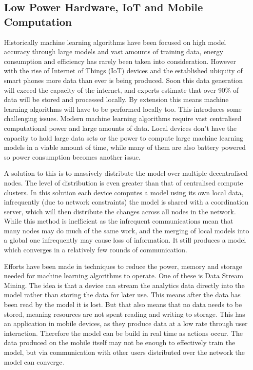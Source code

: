 \subsection{Low Power Hardware, IoT and Mobile Computation}

Historically machine learning algorithms have been focused on high model
accuracy through large models and vast amounts of training data, energy
consumption and efficiency has rarely been taken into consideration. However
with the rise of Internet of Things (IoT) devices and the established ubiquity
of smart phones more data than ever is being produced. Soon this data generation
will exceed the capacity of the internet, and experts estimate that over 90\% of
data will be stored and processed locally. \cite{Chaing2016FogIoT} By extension
this means machine learning algorithms will have to be performed locally too.
This introduces some challenging issues. Modern machine learning algorithms
require vast centralised computational power and large amounts of data. Local
devices don't have the capacity to hold large data sets or the power to compute
large machine learning models in a viable amount of time, while many of them are
also battery powered so power consumption becomes another issue.

A solution to this is to massively distribute the model over multiple
decentralised nodes. The level of distribution is even greater than that of
centralised compute clusters. In this solution each device computes a model
using its own local data, infrequently (due to network constraints) the model is
shared with a coordination server, which will then distribute the changes across
all nodes in the network. \cite{wang2018EdgeLearning} While this method is
inefficient as the infrequent communications mean that many nodes may do much of
the same work, and the merging of local models into a global one infrequently
may cause loss of information. It still produces a model which converges in a
relatively few rounds of communication. \cite{konevcny2016federated}

Efforts have been made in techniques to reduce the power, memory and storage
needed for machine learning algorithms to operate. One of these is Data Stream
Mining. The idea is that a device can stream the analytics data directly into
the model rather than storing the data for later use.
\cite{garciaMartin2019MLEnergy} This means after the data has been read by the
model it is lost. But that also means that no data needs to be stored, meaning
resources are not spent reading and writing to storage. This has an application
in mobile devices, as they produce data at a low rate through user interaction.
Therefore the model can be build in real time as actions occur. The data
produced on the mobile itself may not be enough to effectively train the model,
but via communication with other users distributed over the network the model
can converge. \cite{konevcny2016federated}

